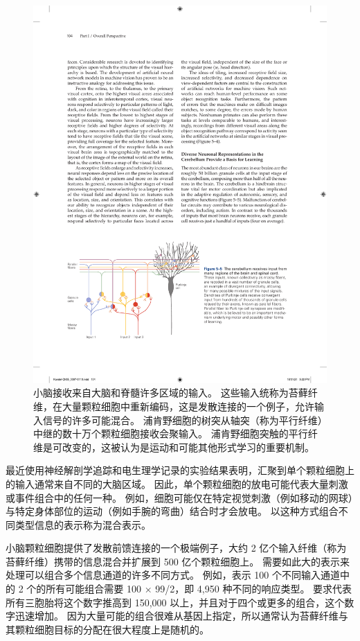 \begin{figure}[htbp]
	\centering
	\includegraphics[width=1.0\linewidth]{chap05/fig_5_5}
	\caption{小脑接收来自大脑和脊髓许多区域的输入。 
		这些输入统称为苔藓纤维，在大量颗粒细胞中重新编码，这是发散连接的一个例子，允许输入信号的许多可能混合。 
		浦肯野细胞的树突从轴突（称为平行纤维）中继的数十万个颗粒细胞接收会聚输入。 
		浦肯野细胞突触的平行纤维是可改变的，这被认为是运动和可能其他形式学习的重要机制。}
	\label{fig:5_5}
\end{figure}


最近使用神经解剖学追踪和电生理学记录的实验结果表明，汇聚到单个颗粒细胞上的输入通常来自不同的大脑区域。
因此，单个颗粒细胞的放电可能代表大量刺激或事件组合中的任何一种。
例如，细胞可能仅在特定视觉刺激（例如移动的网球）与特定身体部位的运动（例如手腕的弯曲）结合时才会放电。 
以这种方式组合不同类型信息的表示称为混合表示。


小脑颗粒细胞提供了发散前馈连接的一个极端例子，大约 2 亿个输入纤维（称为苔藓纤维）携带的信息混合并扩展到 500 亿个颗粒细胞上。 
需要如此大的表示来处理可以组合多个信息通道的许多不同方式。
例如，表示 100 个不同输入通道中的 2 个的所有可能组合需要 100 × 99/2，即 4,950 种不同的响应类型。 
要求代表所有三胞胎将这个数字推高到 150,000 以上，并且对于四个或更多的组合，这个数字迅速增加。 
因为大量可能的组合很难从基因上指定，所以通常认为苔藓纤维与其颗粒细胞目标的分配在很大程度上是随机的。


